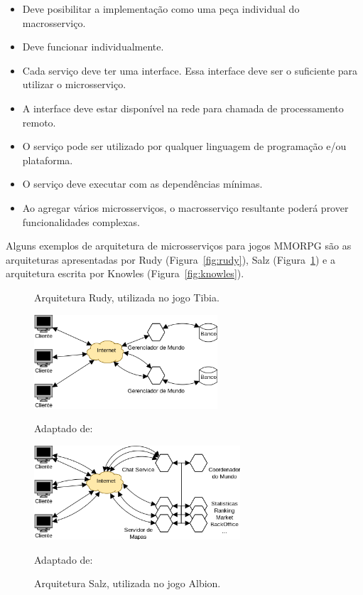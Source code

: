 \begin{itemize}
  \item Deve posibilitar a implementação como uma peça individual do macrosserviço.
  \item Deve funcionar individualmente.
  \item Cada serviço deve ter uma interface. Essa interface deve ser o suficiente para utilizar o microsserviço.
  \item A interface deve estar disponível na rede para chamada de processamento remoto.
  \item O serviço pode ser utilizado por qualquer linguagem de programação e/ou plataforma.
  \item O serviço deve executar com as dependências mínimas.
  \item Ao agregar vários microsserviços, o macrosserviço resultante poderá prover funcionalidades complexas.
\end{itemize}

Alguns exemplos de arquitetura de microsserviços para jogos \ac{MMORPG} são as arquiteturas apresentadas por Rudy (Figura~\ref{fig:rudy}), Salz (Figura~\ref{fig:salz}) e a arquitetura escrita por Knowles (Figura~\ref{fig:knowles}).

\begin{figure}[htb!]
  \begin{minipage}{.5\textwidth}
    \caption{Arquitetura Rudy, utilizada no jogo Tibia.}
    \label{fig:rudy}
    \includegraphics[height=3.5cm]{arquiteturas/rudy.png}
    \centering

    Adaptado de:~\cite{matthiasrudy2011}
  \end{minipage}
  \begin{minipage}{.5\textwidth}
    \caption{Arquitetura Salz, utilizada no jogo Albion.}
    \label{fig:salz}
    \includegraphics[height=3.5cm]{arquiteturas/salz.png}
    \centering

    Adaptado de:~\cite{albion_online_unite}
  \end{minipage}%
\end{figure}

